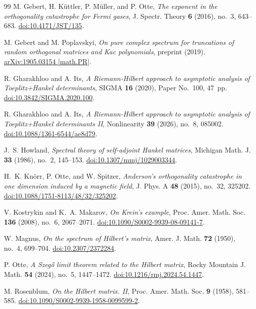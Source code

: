 \documentclass[11pt,a4paper,reqno]{amsart}
\theoremstyle{remark}
\begin{document}
\begin{thebibliography}{99}
M. Gebert, H. K\"uttler, P. M\"uller, and P. Otte,
\emph{The exponent in the orthogonality catastrophe for Fermi gases},
J. Spectr. Theory \textbf{6} (2016), no.~3, 643--683.
\href{https://doi.org/10.4171/JST/135}{doi:10.4171/JST/135}.

M. Gebert and M. Poplavskyi,
\emph{On pure complex spectrum for truncations of random orthogonal matrices and Kac polynomials},
preprint (2019).
\href{https://arxiv.org/abs/1905.03154}{arXiv:1905.03154 [math.PR]}.

R. Gharakhloo and A. Its,
\emph{A Riemann-Hilbert approach to asymptotic analysis of Toeplitz+Hankel determinants},
SIGMA \textbf{16} (2020), Paper No.~100, 47~pp.
\href{https://doi.org/10.3842/SIGMA.2020.100}{doi:10.3842/SIGMA.2020.100}.

R. Gharakhloo and A. Its,
\emph{A Riemann-Hilbert approach to asymptotic analysis of Toeplitz+Hankel determinants II},
Nonlinearity \textbf{39} (2026), no.~8, 085002.
\href{https://doi.org/10.1088/1361-6544/ae8d79}{doi:10.1088/1361-6544/ae8d79}.

J.~S. Howland,
\emph{Spectral theory of self-adjoint Hankel matrices},
Michigan Math. J. \textbf{33} (1986), no.~2, 145--153.
\href{https://doi.org/10.1307/mmj/1029003344}{doi:10.1307/mmj/1029003344}.

H.~K. Kn\"orr, P. Otte, and W. Spitzer,
\emph{Anderson's orthogonality catastrophe in one dimension induced by a magnetic field},
J. Phys. A \textbf{48} (2015), no.~32, 325202.
\href{https://doi.org/10.1088/1751-8113/48/32/325202}{doi:10.1088/1751-8113/48/32/325202}.

V. Kostrykin and K.~A. Makarov,
\emph{On Krein's example},
Proc. Amer. Math. Soc. \textbf{136} (2008), no.~6, 2067--2071.
\href{https://doi.org/10.1090/S0002-9939-08-09141-7}{doi:10.1090/S0002-9939-08-09141-7}.

W. Magnus,
\emph{On the spectrum of Hilbert's matrix},
Amer. J. Math. \textbf{72} (1950), no.~4, 699--704.
\href{https://doi.org/10.2307/2372284}{doi:10.2307/2372284}.

P. Otte,
\emph{A Szeg\H{o} limit theorem related to the Hilbert matrix},
Rocky Mountain J. Math. \textbf{54} (2024), no.~5, 1447--1472.
\href{https://doi.org/10.1216/rmj.2024.54.1447}{doi:10.1216/rmj.2024.54.1447}.

M. Rosenblum,
\emph{On the Hilbert matrix. II},
Proc. Amer. Math. Soc. \textbf{9} (1958), 581--585.
\href{https://doi.org/10.1090/S0002-9939-1958-0099599-2}{doi:10.1090/S0002-9939-1958-0099599-2}.


\end{thebibliography}
\end{document}
